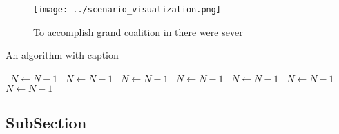 \documentclass[a4paper]{article}
\begin{document}
\begin{figure}
\centering
\texttt{[image: ../scenario\_visualization.png]}
\caption{To accomplish grand coalition in there were sever
}
\end{figure}
 
\begin{algorithm}
\caption{An algorithm with caption}
\begin{algorithmic}
\    \State $N \gets N - 1$
\    \State $N \gets N - 1$
\    \State $N \gets N - 1$
\    \State $N \gets N - 1$
\    \State $N \gets N - 1$
\    \State $N \gets N - 1$
\    \State $N \gets N - 1$
\EndWhile
\end{algorithmic}
\end{algorithm}

\subsection{SubSection}
\end{document}
